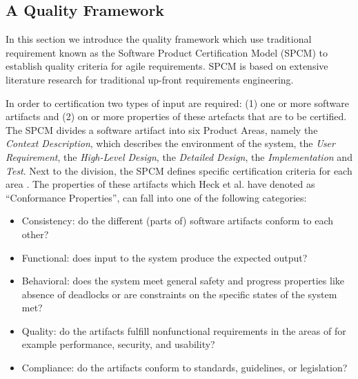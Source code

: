 \subsection{A Quality Framework} \label{usq_2}
In this section we introduce the quality framework which use traditional requirement known as the Software Product Certification Model (SPCM)\cite{heck2010software} to establish quality criteria for agile requirements. SPCM is based on extensive literature research for traditional up-front requirements engineering. 

In order to certification two types of input are required: (1) one or more software artifacts and (2) on or more properties of these artefacts that are to be certified. The SPCM divides a software artifact into six Product Areas, namely the \emph{Context Description}, which describes the environment of the system, the \emph{User Requirement}, the \emph{High-Level Design}, the \emph{Detailed Design}, the \emph{Implementation} and \emph{Test}. Next to the division, the SPCM defines specific certification criteria for each area \cite{heck2010software}. The properties of these artifacts which Heck et al. have denoted as \enquote{Conformance Properties}, can fall into one of the following categories:

\begin{itemize}
\item Consistency: do the different (parts of) software artifacts conform to each other?
\item Functional: does input to the system produce the expected output?
\item Behavioral: does the system meet general safety and progress properties like absence of deadlocks or are constraints on the speciﬁc states of the system met?
\item Quality: do the artifacts fulﬁll nonfunctional requirements in the areas of for example performance, security, and usability?
\item	Compliance: do the artifacts conform to standards, guidelines, or legislation?

\end{itemize}

